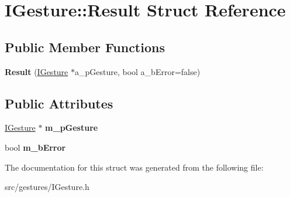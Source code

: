 \hypertarget{struct_i_gesture_1_1_result}{}\section{I\+Gesture\+:\+:Result Struct Reference}
\label{struct_i_gesture_1_1_result}
\subsection*{Public Member Functions}
\begin{DoxyCompactItemize}
\item 
\mbox{\label{struct_i_gesture_1_1_result_a7eca96c48eb023bc8ba6baa72c8ac92f}} 
{\bfseries Result} (\hyperlink{class_i_gesture}{I\+Gesture} $\ast$a\+\_\+p\+Gesture, bool a\+\_\+b\+Error=false)
\end{DoxyCompactItemize}
\subsection*{Public Attributes}
\begin{DoxyCompactItemize}
\item 
\mbox{\label{struct_i_gesture_1_1_result_abe7b8e7c2882450aed08069f0dd4bd7f}} 
\hyperlink{class_i_gesture}{I\+Gesture} $\ast$ {\bfseries m\+\_\+p\+Gesture}
\item 
\mbox{\label{struct_i_gesture_1_1_result_a1cfab1c7c03fe6831ffd9e66ad2ed938}} 
bool {\bfseries m\+\_\+b\+Error}
\end{DoxyCompactItemize}


The documentation for this struct was generated from the following file\+:\begin{DoxyCompactItemize}
\item 
src/gestures/I\+Gesture.\+h\end{DoxyCompactItemize}
